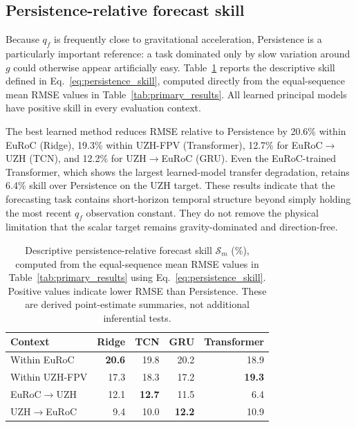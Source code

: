 \documentclass[preprint,12pt]{elsarticle}
\newcommand{\qf}{q_f}
\begin{document}
\subsection{Persistence-relative forecast skill}

Because $\qf$ is frequently close to gravitational acceleration, Persistence is a particularly important reference: a task dominated only by slow variation around $g$ could otherwise appear artificially easy. Table~\ref{tab:persistence_skill} reports the descriptive skill defined in Eq.~\eqref{eq:persistence_skill}, computed directly from the equal-sequence mean RMSE values in Table~\ref{tab:primary_results}. All learned principal models have positive skill in every evaluation context.

The best learned method reduces RMSE relative to Persistence by 20.6\% within EuRoC (Ridge), 19.3\% within UZH-FPV (Transformer), 12.7\% for EuRoC$\rightarrow$UZH (TCN), and 12.2\% for UZH$\rightarrow$EuRoC (GRU). Even the EuRoC-trained Transformer, which shows the largest learned-model transfer degradation, retains 6.4\% skill over Persistence on the UZH target. These results indicate that the forecasting task contains short-horizon temporal structure beyond simply holding the most recent $\qf$ observation constant. They do not remove the physical limitation that the scalar target remains gravity-dominated and direction-free.

\begin{table}[t]
\centering
\caption{Descriptive persistence-relative forecast skill $\mathcal{S}_m$ (\%), computed from the equal-sequence mean RMSE values in Table~\ref{tab:primary_results} using Eq.~\eqref{eq:persistence_skill}. Positive values indicate lower RMSE than Persistence. These are derived point-estimate summaries, not additional inferential tests.}
\label{tab:persistence_skill}
\small
\begin{tabular}{lrrrr}
\toprule
Context & Ridge & TCN & GRU & Transformer \\
\midrule
Within EuRoC & \textbf{20.6} & 19.8 & 20.2 & 18.9 \\
Within UZH-FPV & 17.3 & 18.3 & 17.2 & \textbf{19.3} \\
EuRoC$\rightarrow$UZH & 12.1 & \textbf{12.7} & 11.5 & 6.4 \\
UZH$\rightarrow$EuRoC & 9.4 & 10.0 & \textbf{12.2} & 10.9 \\
\bottomrule
\end{tabular}
\end{table}
\end{document}

